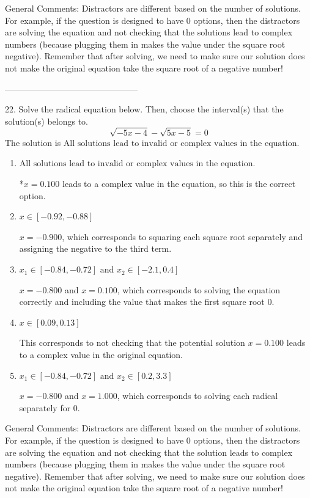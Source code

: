 \documentclass{extbook}[14pt]
\begin{document}
General Comments: Distractors are different based on the number of solutions. For example, if the question is designed to have 0 options, then the distractors are solving the equation and not checking that the solutions lead to complex numbers (because plugging them in makes the value under the square root negative). Remember that after solving, we need to make sure our solution does not make the original equation take the square root of a negative number!

-----------------------------------------------

22. Solve the radical equation below. Then, choose the interval(s) that the solution(s) belongs to.
\[ \sqrt{-5 x - 4} - \sqrt{5 x - 5} = 0 \] 
The solution is $ \text{All solutions lead to invalid or complex values in the equation.} $ 

\begin{enumerate}[label=\Alph*.] 
\item $ \text{All solutions lead to invalid or complex values in the equation.} $ 

 *$x = 0.100$ leads to a complex value in the equation, so this is the correct option. 
\item $ x \in [-0.92,-0.88] $ 

 $x = -0.900$, which corresponds to squaring each square root separately and assigning the negative to the third term. 
\item $ x_1 \in [-0.84, -0.72] \text{ and } x_2 \in [-2.1,0.4] $ 

 $x = -0.800$ and $x = 0.100$, which corresponds to solving the equation correctly and including the value that makes the first square root 0. 
\item $ x \in [0.09,0.13] $ 

 This corresponds to not checking that the potential solution $x = 0.100$ leads to a complex value in the original equation. 
\item $ x_1 \in [-0.84, -0.72] \text{ and } x_2 \in [0.2,3.3] $ 

 $x = -0.800$ and $x = 1.000$, which corresponds to solving each radical separately for 0. 
\end{enumerate} 
 
General Comments: Distractors are different based on the number of solutions. For example, if the question is designed to have 0 options, then the distractors are solving the equation and not checking that the solution leads to complex numbers (because plugging them in makes the value under the square root negative). Remember that after solving, we need to make sure our solution does not make the original equation take the square root of a negative number!
\end{document}
